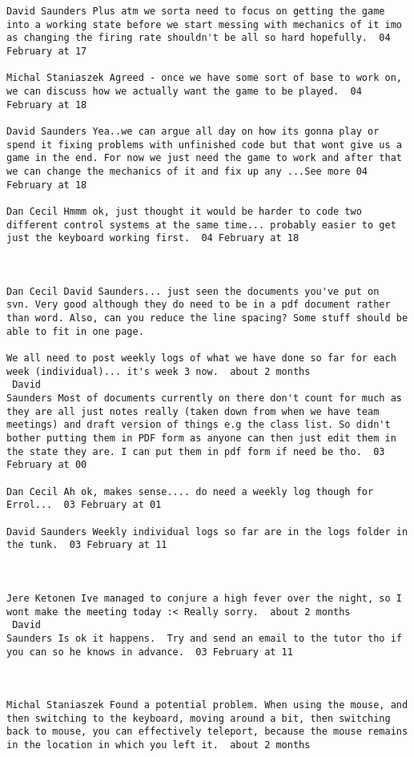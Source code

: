 \begin{verbatim}
David Saunders Plus atm we sorta need to focus on getting the game
into a working state before we start messing with mechanics of it imo
as changing the firing rate shouldn't be all so hard hopefully.  04
February at 17

Michal Staniaszek Agreed - once we have some sort of base to work on,
we can discuss how we actually want the game to be played.  04
February at 18

David Saunders Yea..we can argue all day on how its gonna play or
spend it fixing problems with unfinished code but that wont give us a
game in the end. For now we just need the game to work and after that
we can change the mechanics of it and fix up any ...See more 04
February at 18

Dan Cecil Hmmm ok, just thought it would be harder to code two
different control systems at the same time... probably easier to get
just the keyboard working first.  04 February at 18



Dan Cecil David Saunders... just seen the documents you've put on
svn. Very good although they do need to be in a pdf document rather
than word. Also, can you reduce the line spacing? Some stuff should be
able to fit in one page.

We all need to post weekly logs of what we have done so far for each
week (individual)... it's week 3 now.  about 2 months 
 David
Saunders Most of documents currently on there don't count for much as
they are all just notes really (taken down from when we have team
meetings) and draft version of things e.g the class list. So didn't
bother putting them in PDF form as anyone can then just edit them in
the state they are. I can put them in pdf form if need be tho.  03
February at 00

Dan Cecil Ah ok, makes sense.... do need a weekly log though for
Errol...  03 February at 01

David Saunders Weekly individual logs so far are in the logs folder in
the tunk.  03 February at 11



Jere Ketonen Ive managed to conjure a high fever over the night, so I
wont make the meeting today :< Really sorry.  about 2 months 
 David
Saunders Is ok it happens.  Try and send an email to the tutor tho if
you can so he knows in advance.  03 February at 11



Michal Staniaszek Found a potential problem. When using the mouse, and
then switching to the keyboard, moving around a bit, then switching
back to mouse, you can effectively teleport, because the mouse remains
in the location in which you left it.  about 2 months 



\end{verbatim}
